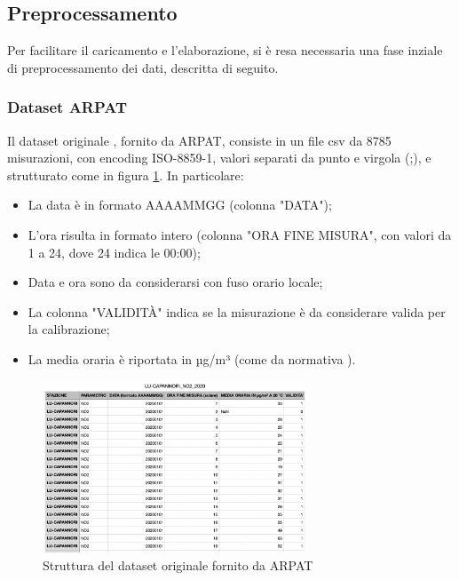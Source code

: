 \subsection{Preprocessamento}\label{ssec:preprocessamento}
Per facilitare il caricamento e l'elaborazione, si è resa necessaria una fase inziale di preprocessamento dei dati, descritta di seguito.

\subsubsection{Dataset ARPAT }
Il dataset originale , fornito da ARPAT, consiste in un file csv da 8785 misurazioni, con encoding ISO-8859-1, valori separati da punto e virgola (;), e strutturato come in figura \ref{fig:ds-arpat}. In particolare:
\begin{itemize}
  \item La data è in formato AAAAMMGG (colonna "DATA");
  \item L'ora risulta in formato intero (colonna "ORA FINE MISURA", con valori da 1 a 24, dove 24 indica le 00:00);
  \item Data e ora sono da considerarsi con fuso orario locale;
  \item La colonna "VALIDITÀ" indica se la misurazione è da considerare valida per la calibrazione;
  \item La media oraria è riportata in µg/m³ (come da normativa \cite{dlgs}).
\end{itemize}

\begin{figure}[H]
\centering
\captionsetup{justification=centering}
\includegraphics[width=0.70\textwidth,height=\textheight,keepaspectratio]{img/dataset_arpat_no2_prima.png}
\caption{Struttura del dataset originale  fornito da ARPAT}
\label{fig:ds-arpat}
\end{figure}

